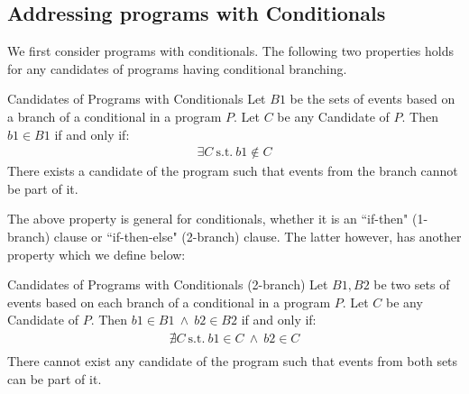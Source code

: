 \subsection{Addressing programs with Conditionals}

        We first consider programs with conditionals. 
        The following two properties holds for any candidates of programs having conditional branching. 
        \begin{property}{Candidates of Programs with Conditionals}
            \label{CondB1}
            Let $B1$ be the sets of events based on a branch of a conditional in a program $P$. 
            Let $C$ be any Candidate of $P$. 
            Then $b1 \in B1$ if and only if:
            \begin{align*}
                \exists C \ \text{s.t.} \ b1 \notin C  
            \end{align*}
            There exists a candidate of the program such that events from the branch cannot be part of it\footnotemark. 
        \end{property}


        The above property is general for conditionals, whether it is an ``if-then" (1-branch) clause or ``if-then-else" (2-branch) clause. 
        The latter however, has another property which we define below:
        \begin{property}{Candidates of Programs with Conditionals (2-branch)}
            \label{CondB2}
            Let $B1,B2$ be two sets of events based on each branch of a conditional in a program $P$. 
            Let $C$ be any Candidate of $P$. 
            Then $b1 \in B1 \ \wedge \ b2 \in B2$ if and only if:
            \begin{align*}
                \nexists C \ \text{s.t.} \ b1 \in C \ \wedge \ b2 \in C \\ 
            \end{align*}
            There cannot exist any candidate of the program such that events from both sets can be part of it\footnotemark. 
        \end{property}


